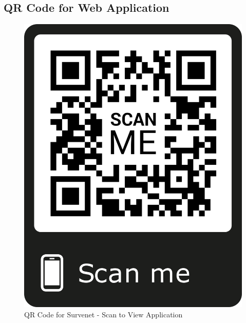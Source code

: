 \subsection{QR Code for Web Application}

\begin{figure}[ht]
	\begin{center}
		\advance\leftskip-3cm
		\advance\rightskip-3cm
		\includegraphics[keepaspectratio=true,scale=.06]{__resources/Appendix/frame.png}
		\caption{QR Code for Survenet - Scan to View Application}
		\label{qr}
	\end{center}
\end{figure}

\newpage